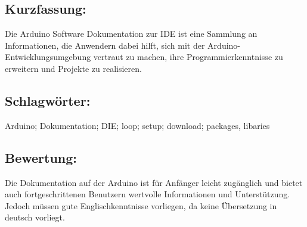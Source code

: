 \subsection*{Kurzfassung:}
Die Arduino Software Dokumentation zur IDE ist eine Sammlung an Informationen, die Anwendern dabei hilft, sich mit der Arduino-Entwicklungsumgebung vertraut zu machen, ihre Programmierkenntnisse zu erweitern und Projekte zu realisieren. 
\subsection*{Schlagwörter:}
Arduino; Dokumentation; DIE; loop; setup; download; packages, libaries
\subsection*{Bewertung:}
Die Dokumentation auf der Arduino ist für Anfänger leicht zugänglich und bietet auch fortgeschrittenen Benutzern wertvolle Informationen und Unterstützung. Jedoch müssen gute Englischkenntnisse vorliegen, da keine Übersetzung in deutsch vorliegt.

